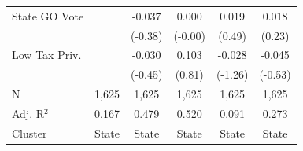 \begin{tabular*}{\textwidth}{@{\extracolsep{\fill}}lccccc}
   State GO Vote        &              & -0.037         & 0.000         & 0.019        & 0.018\\   
                        &              & (-0.38)       & (-0.00)      & (0.49)      & (0.23)\\   
   Low Tax Priv.        &              & -0.030         & 0.103         & -0.028       & -0.045\\   
                        &              & (-0.45)       & (0.81)       & (-1.26)     & (-0.53)\\   
   \hline
   N         & 1,625        & 1,625          & 1,625         & 1,625        & 1,625\\  
   Adj. R$^2$       & 0.167        & 0.479          & 0.520         & 0.091        & 0.273\\  
   Cluster              & State & State & State & State & State\\  
   \bottomrule
\end{tabular*}
\par\endgroup
